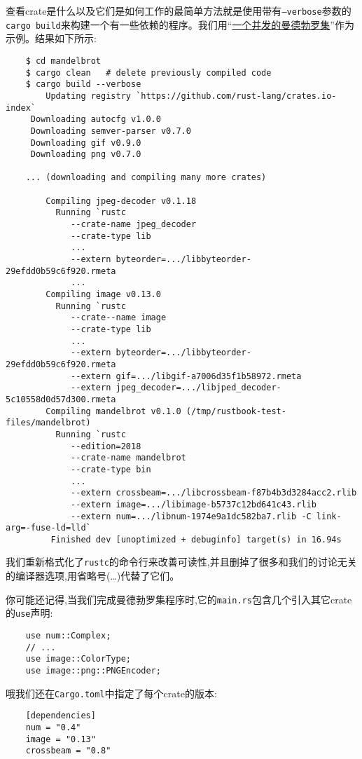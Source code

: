 查看crate是什么以及它们是如何工作的最简单方法就是使用带有\texttt{--verbose}参数的\texttt{cargo build}来构建一个有一些依赖的程序。我们用“\hyperref[mandelbrot]{一个并发的曼德勃罗集}”作为示例。结果如下所示:
\begin{verbatim}
    $ cd mandelbrot
    $ cargo clean   # delete previously compiled code
    $ cargo build --verbose
        Updating registry `https://github.com/rust-lang/crates.io-index`
     Downloading autocfg v1.0.0
     Downloading semver-parser v0.7.0
     Downloading gif v0.9.0
     Downloading png v0.7.0
    
    ... (downloading and compiling many more crates)

        Compiling jpeg-decoder v0.1.18
          Running `rustc
             --crate-name jpeg_decoder
             --crate-type lib
             ...
             --extern byteorder=.../libbyteorder-29efdd0b59c6f920.rmeta
             ...
        Compiling image v0.13.0
          Running `rustc
             --crate--name image
             --crate-type lib
             ...
             --extern byteorder=.../libbyteorder-29efdd0b59c6f920.rmeta
             --extern gif=.../libgif-a7006d35f1b58972.rmeta
             --extern jpeg_decoder=.../libjped_decoder-5c10558d0d57d300.rmeta
        Compiling mandelbrot v0.1.0 (/tmp/rustbook-test-files/mandelbrot)
          Running `rustc
             --edition=2018
             --crate-name mandelbrot
             --crate-type bin
             ...
             --extern crossbeam=.../libcrossbeam-f87b4b3d3284acc2.rlib
             --extern image=.../libimage-b5737c12bd641c43.rlib
             --extern num=.../libnum-1974e9a1dc582ba7.rlib -C link-arg=-fuse-ld=lld`
         Finished dev [unoptimized + debuginfo] target(s) in 16.94s
\end{verbatim}

我们重新格式化了\texttt{rustc}的命令行来改善可读性,并且删掉了很多和我们的讨论无关的编译器选项,用省略号(\ldots)代替了它们。

你可能还记得,当我们完成曼德勃罗集程序时,它的\texttt{main.rs}包含几个引入其它crate的\texttt{use}声明:
\begin{verbatim}
    use num::Complex;
    // ...
    use image::ColorType;
    use image::png::PNGEncoder;
\end{verbatim}

哦我们还在\texttt{Cargo.toml}中指定了每个crate的版本:
\begin{verbatim}
    [dependencies]
    num = "0.4"
    image = "0.13"
    crossbeam = "0.8"
\end{verbatim}

